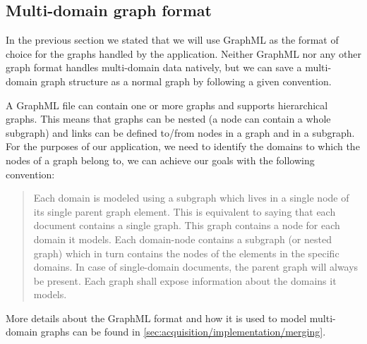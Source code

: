 \subsection{Multi-domain graph format}

In the previous section we stated that we will use GraphML as the format of choice for the graphs handled by the application. Neither GraphML nor any other graph format handles multi-domain data natively, but we can save a multi-domain graph structure as a normal graph by following a given convention.

A GraphML file can contain one or more graphs and supports hierarchical graphs. This means that graphs can be nested (\ie a node can contain a whole subgraph) and links can be defined to/from nodes in a graph and in a subgraph. For the purposes of our application, we need to identify the domains to which the nodes of a graph belong to, we can achieve our goals with the following convention:

\begin{quote}
Each domain is modeled using a subgraph which lives in a single node of its single parent graph element. This is equivalent to saying that each document contains a single graph. This graph contains a node for each domain it models. Each domain-node contains a subgraph (or nested graph) which in turn contains the nodes of the elements in the specific domains. In case of single-domain documents, the parent graph will always be present. Each graph shall expose information about the domains it models.
\end{quote}

More details about the GraphML format and how it is used to model multi-domain graphs can be found in \vref{sec:acquisition/implementation/merging}.
